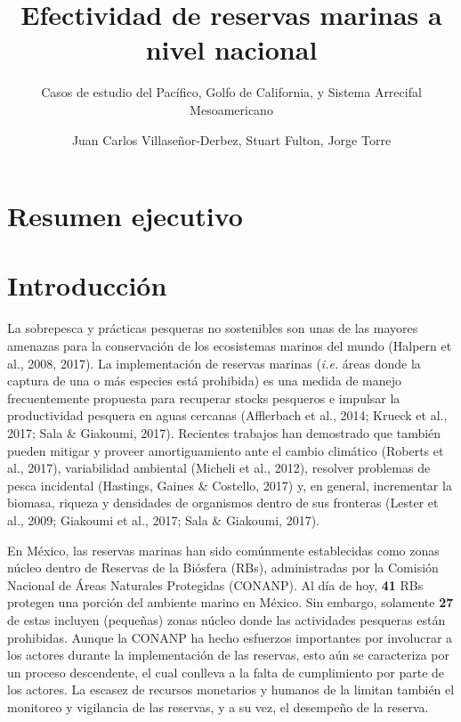 \documentclass[12pt,]{article}
\title{Efectividad de reservas marinas a nivel nacional}
\subtitle{Casos de estudio del Pacífico, Golfo de California, y Sistema Arrecifal
Mesoamericano}
\author{Juan Carlos Villaseñor-Derbez, Stuart Fulton, Jorge Torre}
\date{}
\begin{document}
\maketitle

{
\setcounter{tocdepth}{2}
\tableofcontents
}
\section{Resumen ejecutivo}\label{resumen-ejecutivo}

\section{Introducción}\label{introduccion}

La sobrepesca y prácticas pesqueras no sostenibles son unas de las
mayores amenazas para la conservación de los ecosistemas marinos del
mundo (Halpern et al., 2008, 2017). La implementación de reservas
marinas (\emph{i.e.} áreas donde la captura de una o más especies está
prohibida) es una medida de manejo frecuentemente propuesta para
recuperar stocks pesqueros e impulsar la productividad pesquera en aguas
cercanas (Afflerbach et al., 2014; Krueck et al., 2017; Sala \&
Giakoumi, 2017). Recientes trabajos han demostrado que también pueden
mitigar y proveer amortiguamiento ante el cambio climático (Roberts et
al., 2017), variabilidad ambiental (Micheli et al., 2012), resolver
problemas de pesca incidental (Hastings, Gaines \& Costello, 2017) y, en
general, incrementar la biomasa, riqueza y densidades de organismos
dentro de sus fronteras (Lester et al., 2009; Giakoumi et al., 2017;
Sala \& Giakoumi, 2017).

En México, las reservas marinas han sido comúnmente establecidas como
zonas núcleo dentro de Reservas de la Biósfera (RBs), administradas por
la Comisión Nacional de Áreas Naturales Protegidas (CONANP). Al día de
hoy, \textbf{41} RBs protegen una porción del ambiente marino en México.
Sin embargo, solamente \textbf{27} de estas incluyen (pequeñas) zonas
núcleo donde las actividades pesqueras están prohibidas. Aunque la
CONANP ha hecho esfuerzos importantes por involucrar a los actores
durante la implementación de las reservas, esto aún se caracteriza por
un proceso descendente, el cual conlleva a la falta de cumplimiento por
parte de los actores. La escasez de recursos monetarios y humanos de la
limitan también el monitoreo y vigilancia de las reservas, y a su vez,
el desempeño de la reserva.
\end{document}
